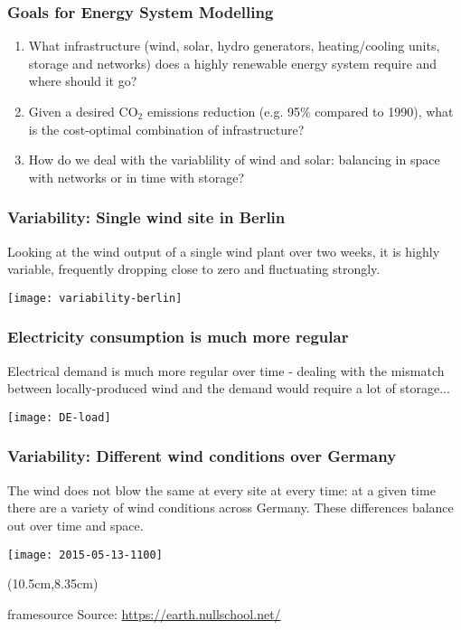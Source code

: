 \documentclass[10pt,aspectratio=169,dvipsnames]{beamer}
\def\co2{CO${}_2$}
\newcommand{\source}[1]{\begin{textblock*}{5cm}(10.5cm,8.35cm)
    \begin{beamercolorbox}[ht=0.5cm,right]{framesource}
        \usebeamerfont{framesource}\usebeamercolor[fg]{framesource} Source: {#1}
    \end{beamercolorbox}
\end{textblock*}}
\let\olditem\item
\renewcommand{\item}{%
\olditem\vspace{5pt}}
\begin{document}
\begin{frame}[fragile]
  \frametitle{Goals for Energy System Modelling}

  \begin{enumerate}
  \item What \alert{infrastructure} (wind, solar, hydro generators,
    heating/cooling units, storage and networks) does a highly renewable energy system
    require and \alert{where} should it go?
  \item Given a desired \co2 emissions reduction (e.g. 95\% compared to 1990),
    what is the \alert{cost-optimal} combination of infrastructure?
  \item How do we deal with the \alert{variablility} of wind and solar: balancing in space with networks or in time with storage?
  \end{enumerate}



\end{frame}


\begin{frame}
  \frametitle{Variability: Single wind site in Berlin}

  Looking at the wind output of a single wind plant over two weeks, it is highly
  variable, frequently dropping close to zero and fluctuating strongly.

  \centering
  \texttt{[image: variability-berlin]}


\end{frame}



\begin{frame}
  \frametitle{Electricity consumption is much more regular}

  Electrical demand is much more regular over time - dealing with the
  \alert{mismatch} between locally-produced wind and the demand would
  require a lot of storage...

  \centering
  \texttt{[image: DE-load]}


\end{frame}



\begin{frame}
  \frametitle{Variability: Different wind conditions over Germany}

  The wind does not blow the same at every site at every time: at a given time there are a variety of wind conditions across Germany. These differences \alert{balance out over time and space}.

  \centering
  \texttt{[image: 2015-05-13-1100]}

  \source{\url{https://earth.nullschool.net/}}

\end{frame}
\end{document}
